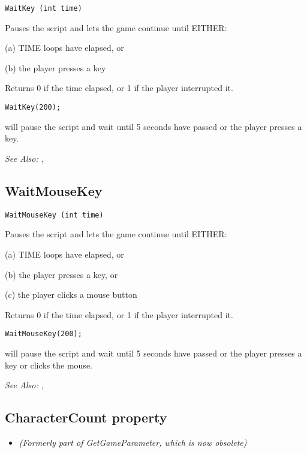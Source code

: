 \begin{verbatim}
WaitKey (int time)
\end{verbatim}
Pauses the script and lets the game continue until EITHER:

(a) TIME loops have elapsed, or

(b) the player presses a key

Returns 0 if the time elapsed, or 1 if the player interrupted it.

\begin{verbatim}
WaitKey(200);
\end{verbatim}
will pause the script and wait until 5 seconds have passed or the player presses a key.

\it{See Also:} , 

\subsection{WaitMouseKey}\label{WaitMouseKey}%

\begin{verbatim}
WaitMouseKey (int time)
\end{verbatim}
Pauses the script and lets the game continue until EITHER:

(a) TIME loops have elapsed, or

(b) the player presses a key, or

(c) the player clicks a mouse button

Returns 0 if the time elapsed, or 1 if the player interrupted it.

\begin{verbatim}
WaitMouseKey(200);
\end{verbatim}
will pause the script and wait until 5 seconds have passed or the player presses a key or
clicks the mouse.

\it{See Also:} , 


\subsection{CharacterCount property}\label{Game.CharacterCount}%

\begin{itemize}
\item \it{(Formerly part of GetGameParameter, which is now obsolete)}
\end{itemize}

